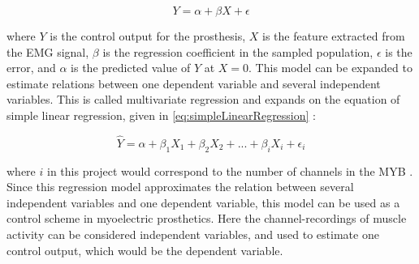 \begin{equation} \label{eq:simpleLinearRegression}
Y = \alpha + \beta X + \epsilon
\end{equation}

where $Y$ is the control output for the prosthesis, $X$ is the feature extracted from the EMG signal, $\beta$ is the regression coefficient in the sampled population, $\epsilon$ is the error, and $\alpha$ is the predicted value of $Y$ at $X = 0$.
This model can be expanded to estimate relations between one dependent variable and several independent variables. This is called multivariate regression and expands on the equation of simple linear regression, given in \eqref{eq:simpleLinearRegression} \cite{Zar2009}:

\begin{equation} \label{eq:multiLinearRegression}
\hat{Y} = \alpha + \beta_1 X_{1} + \beta_2 X_{2} + ... + \beta_i X_{i} + \epsilon_i
\end{equation} 

where $i$ in this project would correspond to the number of channels in the MYB \cite{Zar2009}. Since this regression model approximates the relation between several independent variables and one dependent variable, this model can be used as a control scheme in myoelectric prosthetics. Here the channel-recordings of muscle activity can be considered independent variables, and used to estimate one control output, which would be the dependent variable. \cite{Bruun2017}

